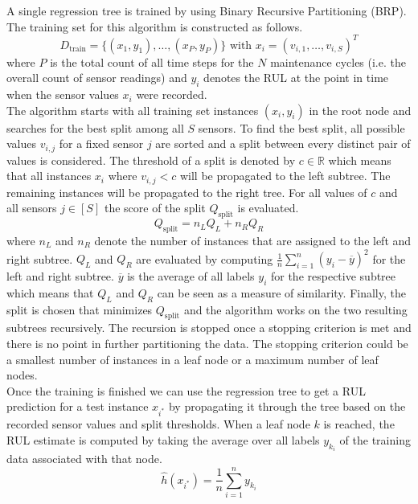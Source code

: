A single regression tree is trained by using Binary Recursive Partitioning (BRP). The training set for this algorithm is constructed as follows.
\begin{equation} \label{eq:rul_random_forests_training_set}
    D_\text{train} = \{(x_1, y_1), \ldots, (x_P, y_P)\} \text{ with } x_i = (v_{i,1}, \ldots, v_{i,S})^T
\end{equation}
where $P$ is the total count of all time steps for the $N$ maintenance cycles (i.e. the overall count of sensor readings) and $y_i$ denotes the RUL at the point in time when the sensor values $x_i$ were recorded.\\
The algorithm starts with all training set instances $(x_i, y_i)$ in the root node and searches for the best split among all $S$ sensors. To find the best split, all possible values $v_{i, j}$ for a fixed sensor $j$ are sorted and a split between every distinct pair of values is considered. The threshold of a split is denoted by $c\in \mathbb{R}$ which means that all instances $x_i$ where $v_{i,j} < c$ will be propagated to the left subtree. The remaining instances will be propagated to the right tree. For all values of $c$ and all sensors $j\in [S]$ the score of the split $Q_\text{split}$ is evaluated.
\begin{equation}
    Q_\text{split} = n_LQ_L+n_RQ_R
\end{equation}
where $n_L$ and $n_R$ denote the number of instances that are assigned to the left and right subtree. $Q_L$ and $Q_R$ are evaluated by computing $\frac{1}{n}\sum_{i=1}^n(y_i-\overline{y})^2$ for the left and right subtree. $\overline{y}$ is the average of all labels $y_i$ for the respective subtree which means that $Q_L$ and $Q_R$ can be seen as a measure of similarity. Finally, the split is chosen that minimizes $Q_\text{split}$ and the algorithm works on the two resulting subtrees recursively. The recursion is stopped once a stopping criterion is met and there is no point in further partitioning the data. The stopping criterion could be a smallest number of instances in a leaf node or a maximum number of leaf nodes.\\
Once the training is finished we can use the regression tree to get a RUL prediction for a test instance $x_{i^*}$ by propagating it through the tree based on the recorded sensor values and split thresholds. When a leaf node $k$ is reached, the RUL estimate is computed by taking the average over all labels $y_{k_i}$ of the training data associated with that node.
\begin{equation}
    \hat{h}(x_{i^*}) = \frac{1}{n}\sum_{i=1}^n y_{k_i}
\end{equation}
